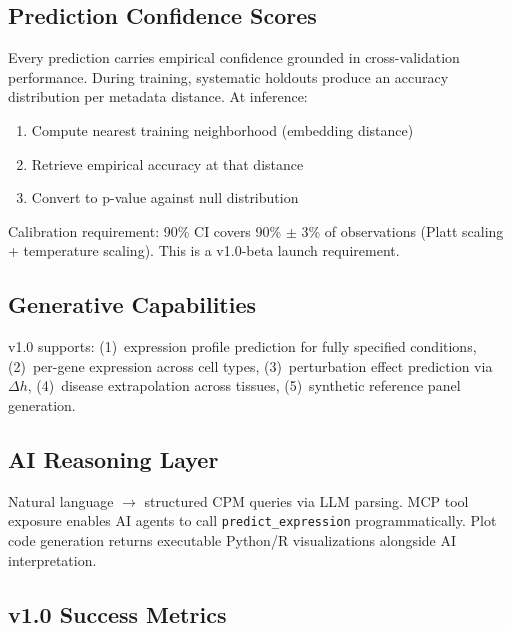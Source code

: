 \documentclass[10pt,twocolumn,letterpaper]{article}
\begin{document}
\subsection{Prediction Confidence Scores}

Every prediction carries empirical confidence grounded in cross-validation
performance. During training, systematic holdouts produce an accuracy
distribution per metadata distance. At inference:
\begin{enumerate}
  \item Compute nearest training neighborhood (embedding distance)
  \item Retrieve empirical accuracy at that distance
  \item Convert to p-value against null distribution
\end{enumerate}

Calibration requirement: 90\% CI covers 90\% $\pm$ 3\% of observations
(Platt scaling + temperature scaling). This is a v1.0-beta launch requirement.

\subsection{Generative Capabilities}

v1.0 supports: (1)~expression profile prediction for fully specified
conditions, (2)~per-gene expression across cell types, (3)~perturbation
effect prediction via $\Delta h$, (4)~disease extrapolation across tissues,
(5)~synthetic reference panel generation.

\subsection{AI Reasoning Layer}

Natural language $\to$ structured CPM queries via LLM parsing. MCP tool
exposure enables AI agents to call \texttt{predict\_expression} programmatically.
Plot code generation returns executable Python/R visualizations alongside
AI interpretation.

\subsection{v1.0 Success Metrics}
\end{document}
